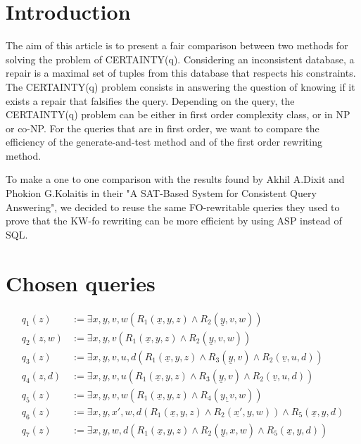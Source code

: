 
\section{Introduction}
The aim of this article is to present a fair comparison between two methods for
solving the problem of CERTAINTY(q). Considering an inconsistent database, a
repair is a maximal set of tuples from this database that respects his
constraints. The CERTAINTY(q) problem consists in answering the question of
knowing if it exists a repair that falsifies the query. Depending on the query,
the CERTAINTY(q) problem can be either in first order complexity class, or in
NP or co-NP. For the queries that are in first order, we want to compare the
efficiency of the generate-and-test method and of the first order rewriting
method.

To make a one to one comparison with the results found by Akhil A.Dixit and
Phokion G.Kolaitis in their "A SAT-Based System for Consistent Query
Answering", we decided to reuse the same FO-rewritable queries they used to prove that the KW-fo rewriting can be more efficient by using ASP instead of SQL.


\section{Chosen queries}


\begin{align*}
q_1(z) &:= \exists x, y, v, w (R_1(\underline{x},y,z) \wedge R_2(\underline{y}, v, w))\\
q_2(z,w) &:=  \exists x, y, v (R_1(\underline{x},y,z) \wedge R_2(\underline{y}, v, w)) \\
q_3(z) &:=  \exists x, y, v, u, d (R_1(\underline{x},y,z) \wedge R_3(\underline{y}, v) \wedge R_2(\underline{v}, u,d)) \\
q_4(z,d) &:=  \exists x, y, v, u (R_1(\underline{x},y,z) \wedge R_3(\underline{y}, v)\wedge R_2(\underline{v}, u, d)) \\
q_5(z) &:= \exists x, y, v, w (R_1(\underline{x},y,z) \wedge R_4(\underline{y, v},w)) \\
q_6(z) &:= \exists x, y, x', w, d (R_1(\underline{x},y,z) \wedge R_2(\underline{x'},y,w)) \wedge R_5(\underline{x},y,d) \\
q_7(z) &:= \exists x, y, w, d (R_1(\underline{x},y,z) \wedge R_2(\underline{y},x,w) \wedge R_5(\underline{x},y,d))
\end{align*}
